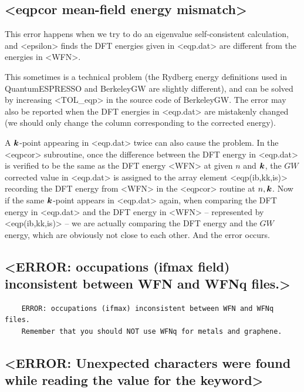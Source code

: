 \documentclass[hyperref, a4paper, 12pt]{report}
\def\texttt#1{<#1>}%
\newcommand{\shortcode}[1]{\texttt{#1}}
\begin{document}
\subsection{\shortcode{eqpcor mean-field energy mismatch}}

This error happens when we try to do an eigenvalue self-consistent calculation,
and \shortcode{epsilon} finds the DFT energies given in \shortcode{eqp.dat} 
are different from the energies in \shortcode{WFN}.

This sometimes is a technical problem 
(the Rydberg energy definitions used in QuantumESPRESSO and BerkeleyGW are slightly different),
and can be solved by increasing \shortcode{TOL_eqp} in the source code of BerkeleyGW.
The error may also be reported 
when the DFT energies in \shortcode{eqp.dat} are mistakenly changed
(we should only change the column corresponding to the corrected energy).

A $\vb*{k}$-point appearing in \shortcode{eqp.dat} twice can also cause the problem.
In the \shortcode{eqpcor} subroutine,
once the difference between the DFT energy in \shortcode{eqp.dat}
is verified to be the same as the DFT energy \shortcode{WFN}
at given $n$ and $\vb*{k}$,
the $GW$ corrected value in \shortcode{eqp.dat} 
is assigned to the array element  \shortcode{eqp(ib,kk,is)}
recording the DFT energy from \shortcode{WFN} in the \shortcode{eqpcor} routine 
at $n, \vb*{k}$.
Now if the same $\vb*{k}$-point appears in \shortcode{eqp.dat} again, 
when comparing the DFT energy in \shortcode{eqp.dat} 
and the DFT energy in \shortcode{WFN} -- represented by \shortcode{eqp(ib,kk,is)} -- 
we are actually comparing the DFT energy and the $GW$ energy,
which are obviously not close to each other. 
And the error occurs.

\subsection{\shortcode{ERROR: occupations (ifmax field) inconsistent between WFN and WFNq files.}}

\begin{lstlisting}
    ERROR: occupations (ifmax) inconsistent between WFN and WFNq files.
    Remember that you should NOT use WFNq for metals and graphene.  
\end{lstlisting}

\subsection{\shortcode{ERROR: Unexpected characters were found while reading the value for the keyword}}
\end{document}
